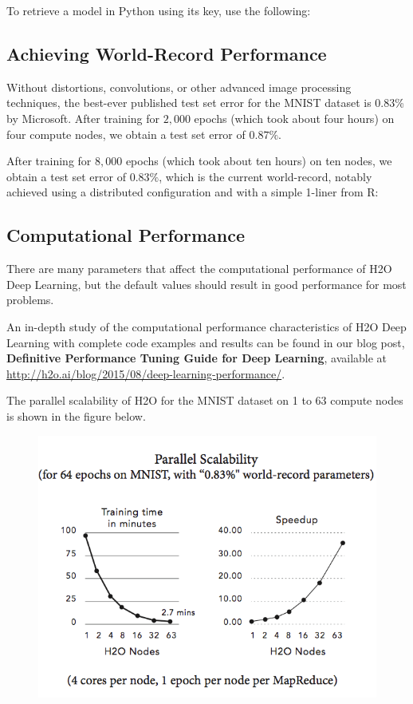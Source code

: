 {{\waterExampleInPython
To retrieve a model in Python using its key, use the following: 



\newpage
\subsection{Achieving World-Record Performance}

Without distortions, convolutions, or other advanced image processing techniques, the best-ever published test set error for the MNIST dataset is $0.83$\% by Microsoft. After training for $2,000$ epochs (which took about four hours) on four compute nodes, we obtain a test set error of $0.87\%$. 

\waterExampleInR
After training for $8,000$ epochs (which took about ten hours) on ten nodes, we obtain a test set error of $0.83\%$, which is the current world-record, notably achieved using a distributed configuration and with a simple 1-liner from R:


\subsection{Computational Performance}
There are many parameters that affect the computational performance of H2O Deep Learning, but the default values should result in good performance for most problems. 

An in-depth study of the computational performance characteristics of H2O Deep Learning with complete code examples and results can be found in our blog post, \textbf{Definitive Performance Tuning Guide for Deep Learning}, available at \url{http://h2o.ai/blog/2015/08/deep-learning-performance/}.

The parallel scalability of H2O for the MNIST dataset on 1 to 63 compute nodes is shown in the figure below.
\begin{figure}[h!]
\centering
\includegraphics[scale=0.6]{scalability_new.png}
\end{figure}

}}
